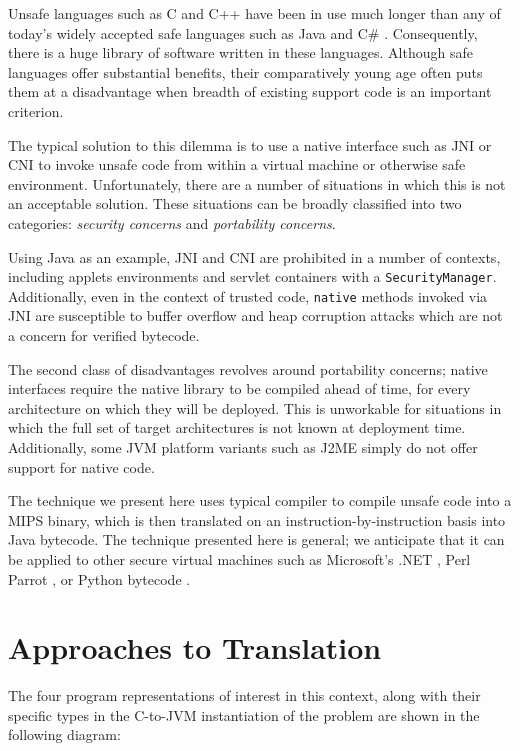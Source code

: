 \documentclass{acmconf}
\begin{document}
Unsafe languages such as C \cite{KR} and C++ \cite{soustroup} have
been in use much longer than any of today's widely accepted safe
languages such as Java \cite{java} and C\# \cite{csharp}.  Consequently, there is
a huge library of software written in these languages.  Although safe
languages offer substantial benefits, their comparatively young age
often puts them at a disadvantage when breadth of existing support
code is an important criterion.

The typical solution to this dilemma is to use a native interface such
as JNI \cite{jni} or CNI \cite{cni} to invoke unsafe code from within a
virtual machine or otherwise safe environment.  Unfortunately, there
are a number of situations in which this is not an acceptable
solution.  These situations can be broadly classified into two
categories: {\it security concerns} and {\it portability concerns}.

Using Java as an example, JNI and CNI are prohibited in a number of
contexts, including applets environments and servlet containers with a
{\tt SecurityManager}.  Additionally, even in the context of trusted
code, {\tt native} methods invoked via JNI are susceptible to buffer
overflow and heap corruption attacks which are not a concern for
verified bytecode.

The second class of disadvantages revolves around portability
concerns; native interfaces require the native library to be compiled
ahead of time, for every architecture on which they will be
deployed.  This is unworkable for situations in which the full set of
target architectures is not known at deployment time.  Additionally,
some JVM platform variants such as J2ME \cite{j2me} simply do not offer
support for native code.

The technique we present here uses typical compiler to compile unsafe
code into a MIPS binary, which is then translated on an
instruction-by-instruction basis into Java bytecode.  The technique
presented here is general; we anticipate that it can be applied to
other secure virtual machines such as Microsoft's .NET \cite{msil}, Perl
Parrot \cite{parrot}, or Python bytecode \cite{python}.

\section{Approaches to Translation}

The four program representations of interest in this context, along
with their specific types in the C-to-JVM instantiation of the
problem are shown in the following diagram:
\end{document}
